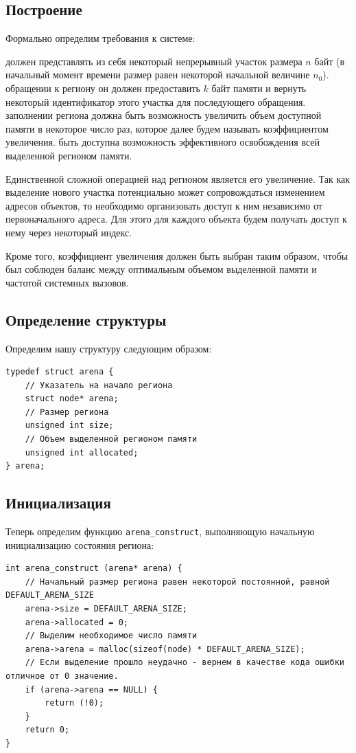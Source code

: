 \documentclass[coursework]{SCWorks}
\begin{document}
\subsection{Построение}
Формально определим требования к системе:
\begin{enumerate}
     должен представлять из себя некоторый непрерывный участок размера $n$ байт (в начальный момент времени размер равен некоторой начальной величине $n_0$).
     обращении к региону он должен предоставить $k$ байт памяти и вернуть некоторый идентификатор этого участка для последующего обращения.
     заполнении региона должна быть возможность увеличить объем доступной памяти в некоторое число раз, которое далее будем называть коэффициентом увеличения.
     быть доступна возможность эффективного освобождения всей выделенной регионом памяти.
\end{enumerate}

Единственной сложной операцией над регионом является его увеличение. Так как выделение нового участка потенциально может сопровождаться изменением адресов объектов, то необходимо организовать доступ к ним независимо от первоначального адреса. Для этого для каждого объекта будем получать доступ к нему через некоторый индекс.

Кроме того, коэффициент увеличения должен быть выбран таким образом, чтобы был соблюден баланс между оптимальным объемом выделенной памяти и частотой системных вызовов.

\subsection{Определение структуры}
Определим нашу структуру следующим образом:
\begin{verbatim} 
typedef struct arena {
    // Указатель на начало региона
    struct node* arena;
    // Размер региона
    unsigned int size;
    // Объем выделенной регионом памяти
    unsigned int allocated;
} arena;
\end{verbatim}

\subsection{Инициализация}
Теперь определим функцию  \texttt{arena\_construct}, выполняющую начальную инициализацию состояния региона:
\begin{verbatim} 
int arena_construct (arena* arena) {
    // Начальный размер региона равен некоторой постоянной, равной DEFAULT_ARENA_SIZE
    arena->size = DEFAULT_ARENA_SIZE;
    arena->allocated = 0;
    // Выделим необходимое число памяти
    arena->arena = malloc(sizeof(node) * DEFAULT_ARENA_SIZE);
    // Если выделение прошло неудачно - вернем в качестве кода ошибки отличное от 0 значение.
    if (arena->arena == NULL) {
        return (!0);
    }
    return 0;
}
\end{verbatim}
\end{document}

